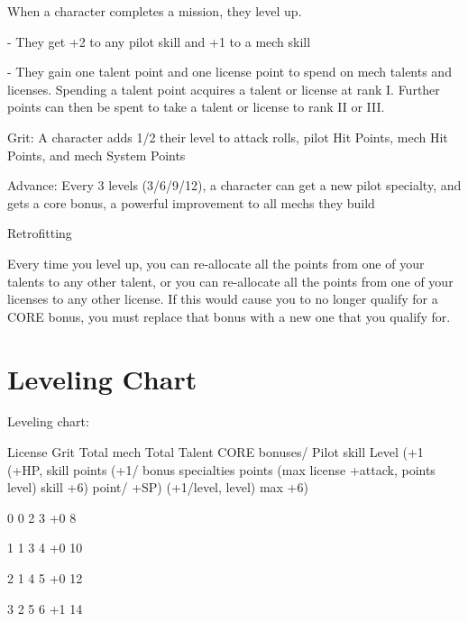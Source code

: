 When a character completes a mission, they level up.

             -   They get +2 to any pilot skill and +1 to a mech skill

             -   They gain one talent point and one license point to spend on mech talents and
                 licenses. Spending a talent point acquires a talent or license at rank I. Further
                 points can then be spent to take a talent or license to rank II or III.





Grit: A character adds 1/2 their level to attack rolls, pilot Hit Points, mech Hit Points, and mech
System Points

Advance: Every 3 levels (3/6/9/12), a character can get a new pilot specialty, and gets a core
bonus, a powerful improvement to all mechs they build


                                              Retrofitting

Every time you level up, you can re-allocate all the points from one of your talents to any other
talent, or you can re-allocate all the points from one of your licenses to any other license. If this
would cause you to no longer qualify for a CORE bonus, you must replace that bonus with a new
one that you qualify for.

\chapter{Leveling Chart}

 Leveling chart:

       License
   Grit        Total mech       Total Talent  CORE bonuses/           Pilot skill
       Level (+1   (+HP,      skill
           points (+1/   bonus specialties       points (max
       license    +attack,    points
          level)                                skill +6)
       point/     +SP)        (+1/level,
       level)                 max +6)

       0           0           2               3              +0                     8

       1           1           3               4              +0                      10

       2           1           4               5              +0                      12

       3           2           5               6              +1                      14

